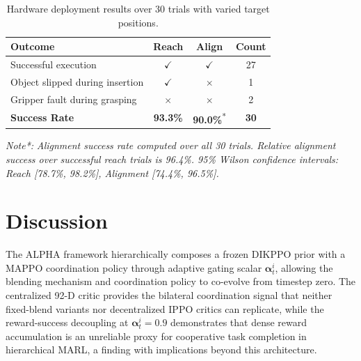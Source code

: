 \documentclass[lettersize,journal]{IEEEtran}
\begin{document}
\begin{table}[t]
\caption{Hardware deployment results over 30 trials with varied target positions.}
\label{hardware_result}
\centering
\footnotesize
\setlength{\tabcolsep}{4pt}
\renewcommand{\arraystretch}{1.2}
\begin{tabular}{l c c c}
\toprule
\textbf{Outcome} & \textbf{Reach} & \textbf{Align} & \textbf{Count} \\
\midrule
Successful execution            & $\checkmark$ & $\checkmark$ & 27 \\
Object slipped during insertion & $\checkmark$ & $\times$     & 1  \\
Gripper fault during grasping   & $\times$     & $\times$     & 2  \\
\midrule
\textbf{Success Rate} & \textbf{93.3\%} & \textbf{90.0\%}\textsuperscript{*} & \textbf{30} \\
\bottomrule
\end{tabular}

\vspace{2pt}
\footnotesize{\textit{Note*:}} \textit{Alignment success rate computed over all 30 trials. Relative alignment success over successful reach trials is 96.4\%. 95\% Wilson confidence intervals: Reach [78.7\%, 98.2\%], Alignment [74.4\%, 96.5\%].}
\end{table}
\section{Discussion}
\label{discussion}
The ALPHA framework hierarchically composes a frozen DIKPPO prior with a MAPPO coordination policy through adaptive gating scalar $\mathbf{\alpha}^{i}_{t}$, allowing the blending mechanism and coordination policy to co-evolve from timestep zero. The centralized 92-D critic provides the bilateral coordination signal that neither fixed-blend variants nor decentralized IPPO critics can replicate, while the reward-success decoupling at $\mathbf{\alpha}^{i}_{t}=0.9$ demonstrates that dense reward accumulation is an unreliable proxy for cooperative task completion in hierarchical MARL, a finding with implications beyond this architecture.
\end{document}
